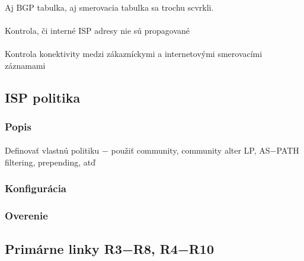 \documentclass[12pt,twoside,a4paper]{report}
\begin{document}
\paragraph{}
Aj BGP tabulka, aj smerovacia tabulka sa trochu scvrkli.

\paragraph{}
Kontrola, či interné ISP adresy nie sú propagované\\




\paragraph{}
Kontrola konektivity medzi zákazníckymi a internetovými smerovacími záznamami










\subsection{ISP politika}
\subsubsection{Popis}
\paragraph{}
Definovať vlastnú politiku − použiť community, community alter LP, AS−PATH filtering, prepending, atď

\subsubsection{Konfigurácia}
\paragraph{}

\subsubsection{Overenie}
\paragraph{}

\subsection{Primárne linky R3−R8, R4−R10}
\end{document}
